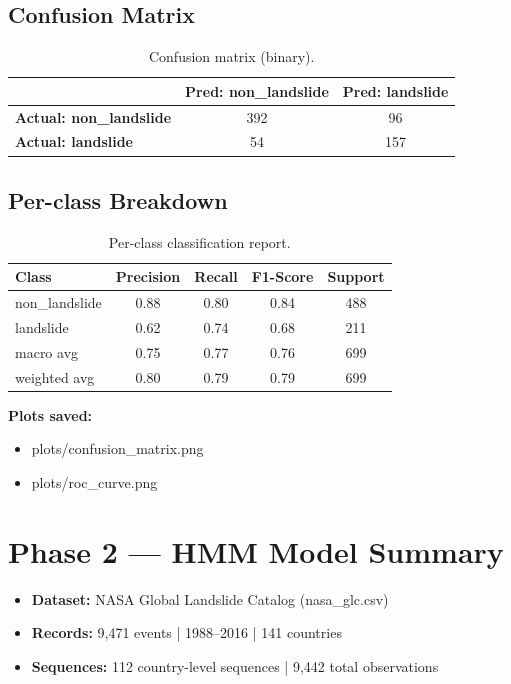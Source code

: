 \documentclass[11pt]{article}
\begin{document}
\subsection{Confusion Matrix}
\begin{table}[h]
    \centering
    \begin{tabular}{@{}lcc@{}}
        \toprule
        & \textbf{Pred: non\_landslide} & \textbf{Pred: landslide} \\ \midrule
        \textbf{Actual: non\_landslide} & 392 & 96 \\
        \textbf{Actual: landslide}      &  54 & 157 \\ \bottomrule
    \end{tabular}
    \caption{Confusion matrix (binary).}
\end{table}

\subsection{Per-class Breakdown}
\begin{table}[h]
    \centering
    \begin{tabular}{@{}lcccc@{}}
        \toprule
        \textbf{Class} & \textbf{Precision} & \textbf{Recall} & \textbf{F1-Score} & \textbf{Support} \\ \midrule
        non\_landslide & 0.88 & 0.80 & 0.84 & 488 \\
        landslide      & 0.62 & 0.74 & 0.68 & 211 \\
        macro avg      & 0.75 & 0.77 & 0.76 & 699 \\
        weighted avg   & 0.80 & 0.79 & 0.79 & 699 \\ \bottomrule
    \end{tabular}
    \caption{Per-class classification report.}
\end{table}

\noindent\textbf{Plots saved:}
\begin{itemize}[noitemsep]
    \item plots/confusion\_matrix.png
    \item plots/roc\_curve.png
\end{itemize}

\section{Phase 2 — HMM Model Summary}

\begin{itemize}
    \item \textbf{Dataset:} NASA Global Landslide Catalog (nasa\_glc.csv)
    \item \textbf{Records:} 9,471 events | 1988–2016 | 141 countries
    \item \textbf{Sequences:} 112 country-level sequences | 9,442 total observations
\end{itemize}
\end{document}
